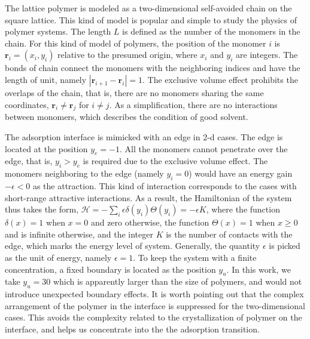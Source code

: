 \documentclass[aps,pre,twocolumn,showpacs,preprintnumbers,amsmath,amssymb]{revtex4-1}
\begin{document}


The lattice polymer is modeled as a two-dimensional self-avoided chain
on the square lattice. This kind of model is popular and simple to study
the physics of polymer systems. The length $L$ is defined as the number of the
monomers in the chain. For this kind of model of polymers, the position
of the monomer $i$ is ${\mathbf r}_i=(x_i,y_i)$ relative to the presumed
origin, where $x_i$ and $y_i$ are integers. The bonds of chain connect
the monomers with the neighboring indices and have the length of unit,
namely $|{\mathbf r}_{i+1}-{\mathbf r}_i|=1$. The exclusive volume effect
prohibits the overlaps of the chain, that is, there are no monomers sharing
the same coordinates, ${\mathbf r}_i\neq {\mathbf r}_j$ for $i\neq j$.
As a simplification, there are no interactions between monomers, which
describes the condition of good solvent.

The adsorption interface is mimicked with an edge in 2-d cases. The edge
is located at the position $y_e=-1$. All the monomers cannot penetrate
over the edge, that is, $y_i>y_e$ is required due to the exclusive volume
effect. The monomers neighboring to the edge (namely $y_i=0$) would have
an energy gain $-\epsilon<0$ as the attraction. This kind of interaction
corresponds to the cases with short-range attractive interactions.
As a result, the Hamiltonian of the system thus takes the form,
${\mathcal H}=-\sum_i \epsilon \delta(y_i)\Theta(y_i) =-\epsilon K$,
where the function $\delta(x)=1$ when $x=0$ and zero otherwise, the
function $\Theta(x)=1$ when $x\ge 0$ and is infinite otherwise, and the
integer $K$ is the number of contacts with the edge, which marks the
energy level of system. Generally, the quantity $\epsilon$ is picked
as the unit of energy, namely $\epsilon=1$.
To keep the system with a finite concentration, a fixed boundary
is located as the position $y_u$. In this work, we take $y_u=30$
which is apparently larger than the size of polymers, and would
not introduce unexpected boundary effects.
It is worth pointing out that the complex arrangement of the polymer
in the interface is suppressed for the two-dimensional cases. This
avoids the complexity related to the crystallization of polymer on
the interface, and helps us concentrate into the the adsorption
transition.
\end{document}
